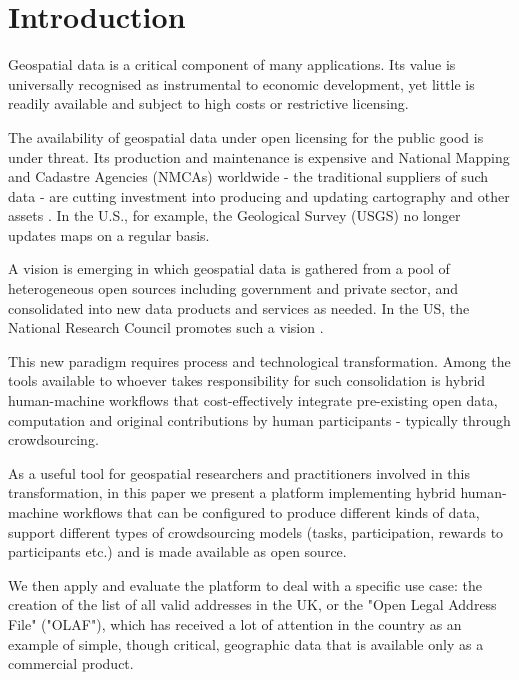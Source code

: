 \section{Introduction}

Geospatial data is a critical component of many applications. Its value is universally recognised as instrumental to economic development, yet little is readily available and subject to high costs or restrictive licensing.

The availability of geospatial data under open licensing for the public good is under threat. Its production and maintenance is expensive and National Mapping and Cadastre Agencies (NMCAs) worldwide - the traditional suppliers of such data - are cutting investment into producing and updating cartography and other assets \cite{ESTES:1994vz}. In the U.S., for example, the Geological Survey (USGS) no longer updates maps on a regular basis.

A vision is emerging in which geospatial data is gathered from a pool of heterogeneous open sources including government and private sector, and consolidated into new data products and services as needed. In the US, the National Research Council promotes such a vision \cite{Committee:1993vp}.

This new paradigm requires process and technological transformation. Among the tools available to whoever takes responsibility for such consolidation is hybrid human-machine workflows that cost-effectively integrate pre-existing open data, computation and original contributions by human participants - typically through crowdsourcing.

As a useful tool for geospatial researchers and practitioners involved in this transformation, in this paper we present a platform implementing hybrid human-machine workflows that can be configured to produce different kinds of data, support different types of crowdsourcing models (tasks, participation, rewards to participants etc.) and is made available as open source.

We then apply and evaluate the platform to deal with a specific use case: the creation of the list of all valid addresses in the UK, or the "Open Legal Address File" ("OLAF"), which has received a lot of attention in the country as an example of simple, though critical, geographic data that is available only as a commercial product.
